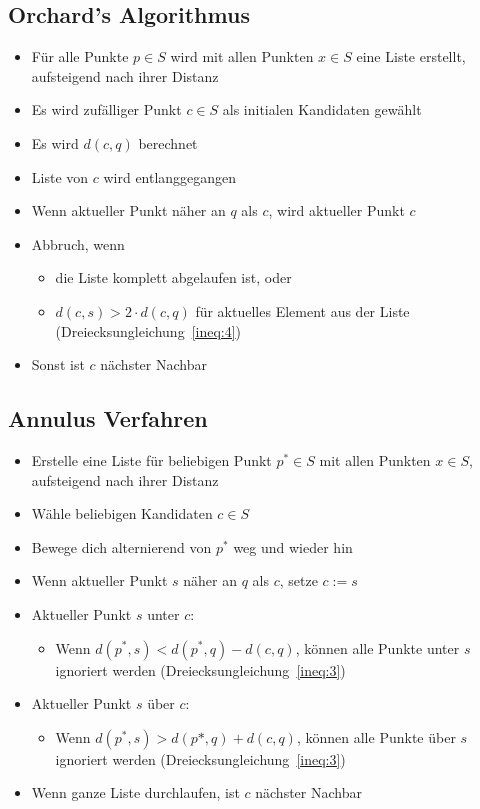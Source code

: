 \documentclass[deutsch,runningheads,a4paper]{llncs}
\begin{document}
  \subsection{Orchard's Algorithmus}
    \begin{itemize}
     \item F\"ur alle Punkte $p \in S$ wird mit allen Punkten $x \in S$ eine Liste erstellt, aufsteigend nach ihrer Distanz
     \item Es wird zufälliger Punkt $c \in S$ als initialen Kandidaten gewählt
     \item Es wird $d(c, q)$ berechnet
     \item Liste von $c$ wird entlanggegangen
     \item Wenn aktueller Punkt näher an $q$ als $c$, wird aktueller Punkt $c$
     \item Abbruch, wenn
      \begin{itemize}
       \item die Liste komplett abgelaufen ist, oder
       \item $d(c, s) > 2 \cdot d(c, q)$ f\"ur aktuelles Element aus der Liste (Dreiecksungleichung~\ref{ineq:4})
      \end{itemize}
     \item Sonst ist $c$ nächster Nachbar
    \end{itemize}
  \subsection{Annulus Verfahren}
   \begin{itemize}
      \item Erstelle eine Liste für beliebigen Punkt $p^* \in S$ mit allen Punkten $x \in S$, aufsteigend nach ihrer Distanz
      \item Wähle beliebigen Kandidaten $c \in S$
      \item Bewege dich alternierend von $p^*$ weg und wieder hin
      \item Wenn aktueller Punkt $s$ näher an $q$ als $c$, setze $c:= s$
      \item Aktueller Punkt $s$ unter $c$:
      \begin{itemize}
      \item Wenn $d(p^*, s) < d(p^*, q) - d(c, q)$, können alle Punkte unter $s$ ignoriert werden (Dreiecksungleichung~\ref{ineq:3})
      \end{itemize}
      \item Aktueller Punkt $s$ über $c$:
      \begin{itemize}
      \item Wenn $d(p^*, s) > d(p*, q) + d(c, q)$, können alle Punkte über $s$ ignoriert werden (Dreiecksungleichung~\ref{ineq:3})
      \end{itemize}
      \item Wenn ganze Liste durchlaufen, ist $c$ nächster Nachbar
    \end{itemize}
\end{document}
